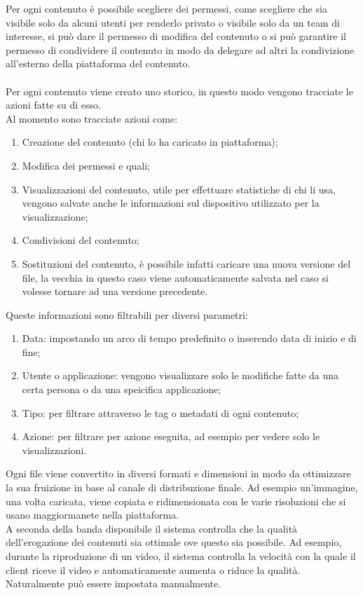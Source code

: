 \documentclass[a4paper, 12pt, twoside, openright]{book}
\begin{document}
Per ogni contenuto è possibile scegliere dei permessi, come scegliere che sia visibile solo da alcuni utenti per renderlo privato o visibile solo da un team di interesse, si può dare il permesso di modifica del contenuto o si può garantire il permesso di condividere il contenuto in modo da delegare ad altri la condivizione all'esterno della piattaforma del contenuto.\\ \\
Per ogni contenuto viene creato uno storico, in questo modo vengono tracciate le azioni fatte su di esso.\\
Al momento sono tracciate azioni come:
\begin{enumerate}
\item Creazione del contenuto (chi lo ha caricato in piattaforma);
\item Modifica dei permessi e quali;
\item Visualizzazioni del contenuto, utile per effettuare statistiche di chi li usa, vengono salvate anche le informazioni sul dispositivo utilizzato per la visualizzazione;
\item Condivisioni del contenuto;
\item Sostituzioni del contenuto, è possibile infatti caricare una nuova versione del file, la vecchia in questo caso viene automaticamente salvata nel caso si volesse tornare ad una versione precedente.
\end{enumerate}
Queste informazioni sono filtrabili per diversi parametri:
\begin{enumerate}
\item Data: impostando un arco di tempo predefinito o inserendo data di inizio e di fine;
\item Utente o applicazione: vengono visualizzare solo le modifiche fatte da una certa persona o da una speicifica applicazione;
\item Tipo: per filtrare attraverso le tag o metadati di ogni contenuto;
\item Azione: per filtrare per azione eseguita, ad esempio per vedere solo le
 visualizzazioni.\\
\end{enumerate}
Ogni file viene convertito in diversi formati e dimensioni in modo da ottimizzare la sua fruizione in base al canale di distribuzione finale. Ad esempio un'immagine, una volta caricata, viene copiata e ridimensionata con le varie risoluzioni che si usano maggiormanete nella piattaforma.\\
A seconda della banda disponibile il sistema controlla che la qualità dell'erogazione dei contenuti sia ottimale ove questo sia possibile. Ad esempio, durante la riproduzione di un video, il sistema controlla la velocità con la quale il client riceve il video e automaticamente aumenta o riduce la qualità. Naturalmente può essere impostata manualmente.\\
\end{document}

